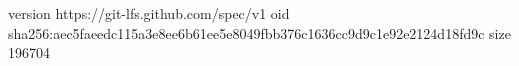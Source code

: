 version https://git-lfs.github.com/spec/v1
oid sha256:aec5faeedc115a3e8ee6b61ee5e8049fbb376c1636cc9d9c1e92e2124d18fd9c
size 196704
